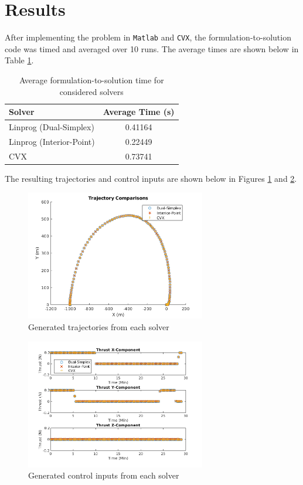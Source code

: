 \documentclass{article}
\begin{document}
\section{Results}

After implementing the problem in \texttt{Matlab} and \texttt{CVX}, the formulation-to-solution code was timed and averaged over 10 runs.
The average times are shown below in Table \ref{tab:timing}.

\begin{table}[h]
\centering
\begin{tabular}{| l | c |}
  \hline
  Solver & Average Time (s) \\ \hline
  Linprog (Dual-Simplex) & 0.41164 \\
  Linprog (Interior-Point) & 0.22449 \\
  CVX & 0.73741 \\ \hline
\end{tabular}
\caption{Average formulation-to-solution time for considered solvers}
\label{tab:timing}
\end{table}

The resulting trajectories and control inputs are shown below in Figures \ref{fig:trajectories} and \ref{fig:controls}.

\begin{figure}[H]
  \centering
  \includegraphics[width=0.7\textwidth]{images/trajectories.png}
  \caption{Generated trajectories from each solver}
  \label{fig:trajectories}
\end{figure}

\begin{figure}[H]
  \centering
  \includegraphics[width=0.7\textwidth]{images/controls.png}
  \caption{Generated control inputs from each solver}
  \label{fig:controls}
\end{figure}
\end{document}
